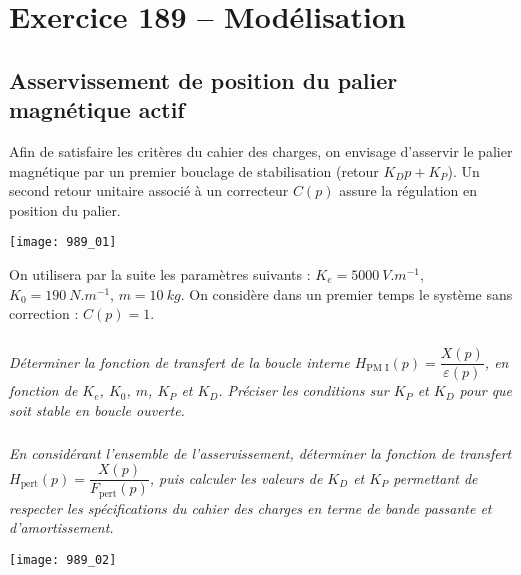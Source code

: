 \section*{Exercice 189 -- Modélisation}
\setcounter{exo}{0}

\subsection*{Asservissement de position du palier magnétique actif}

Afin de satisfaire les critères du cahier des charges, on envisage d'asservir le
palier magnétique par un premier bouclage de stabilisation (retour $K_D p + K_P$).
Un second retour unitaire associé à un correcteur $C(p)$ assure la régulation en
position du palier.

\begin{center}
\texttt{[image: 989\_01]}
\end{center}


On utilisera par la suite les paramètres suivants : $K_e = \SI{5000}{V.m^{-1}}$, $K_0 = \SI{190}{N.m^{-1}}$, $m=\SI{10}{kg}$.
On considère dans un premier temps le système sans correction : $C(p)=1$.


\subparagraph{}
 \textit{Déterminer la fonction de transfert de la boucle interne $H_{\text{PM I}}(p)=\dfrac{X(p)}{\varepsilon(p)}$, en fonction de $K_e$, $K_0$, $m$, $K_P$ et $K_D$. Préciser les conditions sur $K_P$ et $K_D$ pour que soit stable en boucle ouverte.}
\ifprof
\begin{corrige}
\end{corrige}
\else
\fi

\subparagraph{}
 \textit{En considérant l’ensemble de l’asservissement, déterminer la fonction de transfert 
 $H_{\text{pert}}(p)=\dfrac{X(p)}{F_{\text{pert}}(p)}$, puis calculer les valeurs de $K_D$ et $K_P$
permettant de respecter les spécifications du cahier des charges en terme de bande passante et d’amortissement.}
\ifprof
\begin{corrige}
\end{corrige}
\else
\fi


\begin{center}
\texttt{[image: 989\_02]}
\end{center}


\subparagraph{}
 \textit{}
\ifprof
\begin{corrige}
\end{corrige}
\else
\fi



